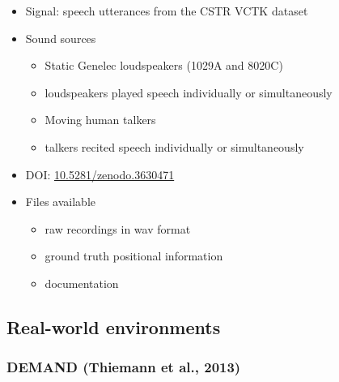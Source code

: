 \documentclass[14pt, legalpaper]{extarticle}
\begin{document}
\begin{itemize}
\item Signal: speech utterances from the CSTR VCTK dataset

\item Sound sources
	\begin{itemize}
	\item Static Genelec loudspeakers (1029A and 8020C)
	\item loudspeakers played speech individually or simultaneously
	\item Moving human talkers
	\item talkers recited speech individually or simultaneously
	\end{itemize}

\item DOI: \href{https://zenodo.org/record/3630471}{10.5281/zenodo.3630471} 

\item Files available
	\begin{itemize}
	\item raw recordings in wav format
	\item ground truth positional information
	\item documentation
	\end{itemize}

\end{itemize}

\subsection{Real-world environments}

\subsubsection{DEMAND (Thiemann et al., 2013)}
\end{document}
